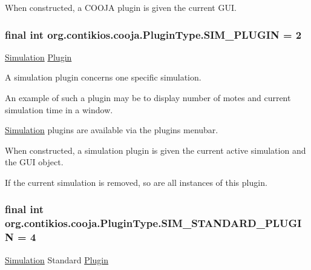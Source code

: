 When constructed, a C\-O\-O\-J\-A plugin is given the current G\-U\-I. \hypertarget{interfaceorg_1_1contikios_1_1cooja_1_1PluginType_a72817595223732361a60e932965ffc24}{
\subsubsection[{S\-I\-M\-\_\-\-P\-L\-U\-G\-I\-N}]{\setlength{\rightskip}{0pt plus 5cm}final int org.\-contikios.\-cooja.\-Plugin\-Type.\-S\-I\-M\-\_\-\-P\-L\-U\-G\-I\-N = 2\hspace{0.3cm}{\ttfamily [static]}}}\label{interfaceorg_1_1contikios_1_1cooja_1_1PluginType_a72817595223732361a60e932965ffc24}
\hyperlink{classorg_1_1contikios_1_1cooja_1_1Simulation}{Simulation} \hyperlink{interfaceorg_1_1contikios_1_1cooja_1_1Plugin}{Plugin}

A simulation plugin concerns one specific simulation.

An example of such a plugin may be to display number of motes and current simulation time in a window.

\hyperlink{classorg_1_1contikios_1_1cooja_1_1Simulation}{Simulation} plugins are available via the plugins menubar.

When constructed, a simulation plugin is given the current active simulation and the G\-U\-I object.

If the current simulation is removed, so are all instances of this plugin. \hypertarget{interfaceorg_1_1contikios_1_1cooja_1_1PluginType_a69999eed1f73b6885fb9111da26599be}{
\subsubsection[{S\-I\-M\-\_\-\-S\-T\-A\-N\-D\-A\-R\-D\-\_\-\-P\-L\-U\-G\-I\-N}]{\setlength{\rightskip}{0pt plus 5cm}final int org.\-contikios.\-cooja.\-Plugin\-Type.\-S\-I\-M\-\_\-\-S\-T\-A\-N\-D\-A\-R\-D\-\_\-\-P\-L\-U\-G\-I\-N = 4\hspace{0.3cm}{\ttfamily [static]}}}\label{interfaceorg_1_1contikios_1_1cooja_1_1PluginType_a69999eed1f73b6885fb9111da26599be}
\hyperlink{classorg_1_1contikios_1_1cooja_1_1Simulation}{Simulation} Standard \hyperlink{interfaceorg_1_1contikios_1_1cooja_1_1Plugin}{Plugin}

